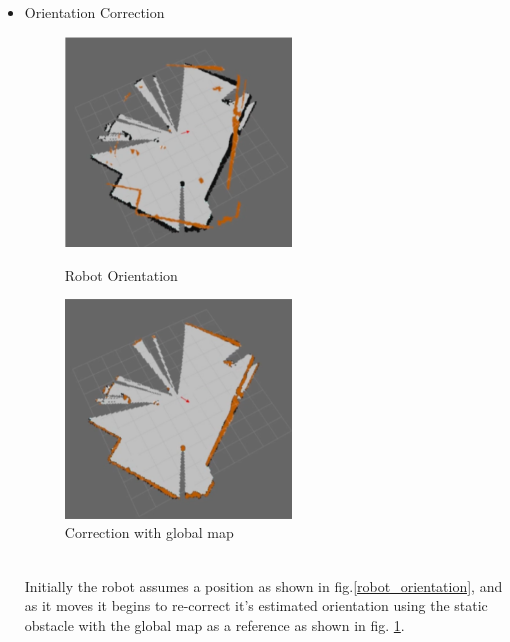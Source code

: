\begin{itemize}
	\item Orientation Correction
	\begin{figure}[!htbp]
		\centering
		\begin{minipage}{.5\textwidth}
			\centering
			\includegraphics[width = 6cm]{Pictures/robotorientation}%
			\caption{Robot Orientation}
			\label{robot_orientation}
		\end{minipage}%
		\begin{minipage}{.5\textwidth}
			\centering
			\includegraphics[width = 6cm]{Pictures/correctionwithglobalmap}%
			\caption{Correction with global map}
			\label{correction_with_globalmap}
		\end{minipage}
	\end{figure}\\
 	Initially the robot assumes a position as shown in fig.\ref{robot_orientation}, and as it moves it begins to re-correct it's estimated orientation using the static obstacle with the global map as a reference as shown in fig. \ref{correction_with_globalmap}. 
\end{itemize}

